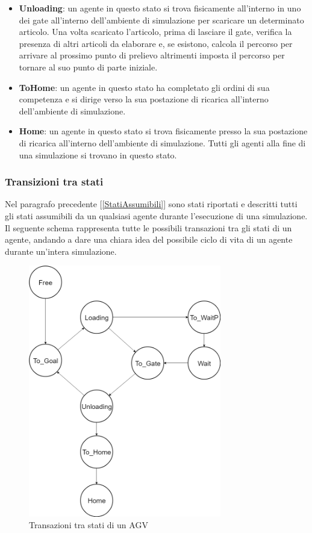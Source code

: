 \documentclass[12pt]{article}
\begin{document}
\begin{itemize}
    \item \textbf{Unloading}:  un agente in questo stato si trova fisicamente all'interno in uno dei gate all'interno dell'ambiente di simulazione per scaricare un determinato articolo. Una volta scaricato l'articolo, prima di lasciare il gate, verifica la presenza di altri articoli da elaborare e, se esistono, calcola il percorso per arrivare al prossimo punto di prelievo altrimenti imposta il percorso per tornare al suo punto di parte iniziale.
    \item \textbf{ToHome}: un agente in questo stato ha completato gli ordini di sua competenza e si dirige verso la sua postazione di ricarica all'interno dell'ambiente di simulazione. 
    \item \textbf{Home}: un agente in questo stato si trova fisicamente presso la sua postazione di ricarica all'interno dell'ambiente di simulazione. Tutti gli agenti alla fine di una simulazione si trovano in questo stato.
\end{itemize}

\newpage

\subsubsection{Transizioni tra stati} \label{TransizioniStati}
Nel paragrafo precedente [\ref{StatiAssumibili}] sono stati riportati e descritti tutti gli stati assumibili da un qualsiasi agente durante l'esecuzione di una simulazione. Il seguente schema rappresenta tutte le possibili transazioni tra gli stati di un agente, andando a dare una chiara idea del possibile ciclo di vita di un agente durante un'intera simulazione.
\begin{figure}[ht]
\centering
\includegraphics[width=0.75\textwidth,keepaspectratio]{Figures/Graphics/State_Transaction.png}
\caption[Transizioni tra stati di un agente]{Transazioni tra stati di un AGV}
\label{fig:TransizioniStati}
\end{figure}
\end{document}
